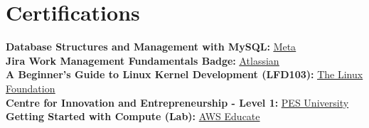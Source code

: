\documentclass[letterpaper,11pt]{article}
\begin{document}
\section{Certifications}
\begin{itemize}[leftmargin=0.15in, label={}]
    \small{\item{
    \textbf{Database Structures and Management with MySQL:}{ \href{https://drive.google.com/file/d/1yk1cgDVw4zl7LSJ7ZCwm0mTG6D1OUiyl/view?usp=sharing}{\color{blue}\underline{Meta}} }\\
    \textbf{Jira Work Management Fundamentals Badge:}{ \href{https://university.atlassian.com/student/award/YUXGUbPbH1wfKhPqoE3UvJ1E}{\color{blue}\underline{Atlassian}}} \\ 
    \textbf{A Beginner's Guide to Linux Kernel Development (LFD103):}{ \href{https://drive.google.com/file/d/1Rc3an_g4eF2UVKEvh6tCYHMYul08s1O3/view?usp=sharing}{\color{blue}\underline{The Linux Foundation}}} \\
    \textbf{Centre for Innovation and Entrepreneurship -  Level 1: }\href{https://drive.google.com/file/d/1TqpBAXJ2q6YzqMNAOdY6SA-zIz7lrH5G/view?usp=sharing}{\color{blue}\underline{PES University}} \\
    \textbf{Getting Started with Compute (Lab): }{\color{blue}\underline{AWS Educate}} \\
    }}
 \end{itemize}
\end{document}
